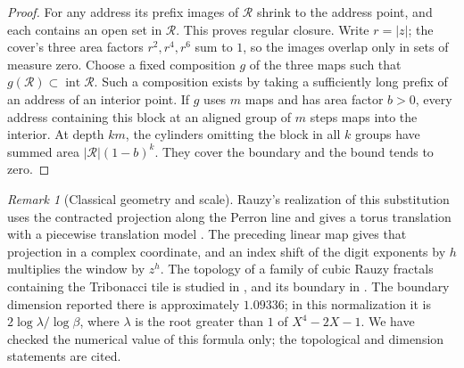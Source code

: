 \documentclass[11pt,reqno]{amsart}
\theoremstyle{definition}
\theoremstyle{remark}
\newtheorem{remark}[theorem]{Remark}
\numberwithin{equation}{section}
\begin{document}
\begin{proof}
For any address its prefix images of \(\mathcal R\) shrink to the
address point, and each contains an open set in \(\mathcal R\).
This proves regular closure. Write \(r=|z|\); the cover's three
area factors \(r^2,r^4,r^6\) sum to \(1\), so the images overlap
only in sets of measure zero. Choose a fixed composition \(g\) of
the three maps such that \(g(\mathcal R)\subset\operatorname{int}\mathcal R\).
Such a composition exists by taking a sufficiently long prefix
of an address of an interior point. If \(g\) uses \(m\) maps and
has area factor \(b>0\), every address containing this block at
an aligned group of \(m\) steps maps into the interior. At depth
\(km\), the cylinders omitting the block in all \(k\) groups
have summed area \(|\mathcal R|(1-b)^k\). They cover the boundary
and the bound tends to zero.
\end{proof}

\begin{remark}[Classical geometry and scale]\label{m9:rauzy-classical}
Rauzy's realization of this substitution uses the contracted
projection along the Perron line and gives a torus translation
with a piecewise translation model \cite{m9:Rauzy}. The preceding
linear map gives that projection in a complex coordinate, and an
index shift of the digit exponents by \(h\) multiplies the window
by \(z^h\). The topology of a family of cubic Rauzy fractals containing
the Tribonacci tile is studied in \cite{m9:Loridant}, and its boundary in
\cite{m9:MessaoudiBoundary}. The boundary dimension reported there is
approximately \(1.09336\); in this normalization it is
\(2\log\lambda/\log\beta\), where \(\lambda\) is the root greater than
\(1\) of \(X^4-2X-1\). We have checked the numerical value of this formula
only; the topological and dimension statements are cited.
\end{remark}
\end{document}
